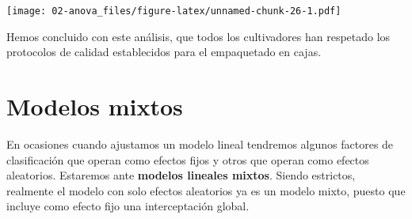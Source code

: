 \documentclass[
]{book}
\newenvironment{Shaded}{\begin{snugshade}}{\end{snugshade}}
\newcommand{\AttributeTok}[1]{\textcolor[rgb]{0.77,0.63,0.00}{#1}}
\newcommand{\ControlFlowTok}[1]{\textcolor[rgb]{0.13,0.29,0.53}{\textbf{#1}}}
\newcommand{\DecValTok}[1]{\textcolor[rgb]{0.00,0.00,0.81}{#1}}
\newcommand{\FunctionTok}[1]{\textcolor[rgb]{0.00,0.00,0.00}{#1}}
\newcommand{\NormalTok}[1]{#1}
\newcommand{\OtherTok}[1]{\textcolor[rgb]{0.56,0.35,0.01}{#1}}
\newcommand{\SpecialCharTok}[1]{\textcolor[rgb]{0.00,0.00,0.00}{#1}}
\newcommand{\StringTok}[1]{\textcolor[rgb]{0.31,0.60,0.02}{#1}}
\begin{document}
\begin{Shaded}
\end{Shaded}

\texttt{[image: 02-anova\_files/figure-latex/unnamed-chunk-26-1.pdf]}

Hemos concluido con este análisis, que todos los cultivadores han respetado los protocolos de calidad establecidos para el empaquetado en cajas.

\hypertarget{modelos-mixtos}{%
\section{Modelos mixtos}\label{modelos-mixtos}}

En ocasiones cuando ajustamos un modelo lineal tendremos algunos factores de clasificación que operan como efectos fijos y otros que operan como efectos aleatorios. Estaremos ante \textbf{modelos lineales mixtos}. Siendo estrictos, realmente el modelo con solo efectos aleatorios ya es un modelo mixto, puesto que incluye como efecto fijo una interceptación global.
\end{document}
